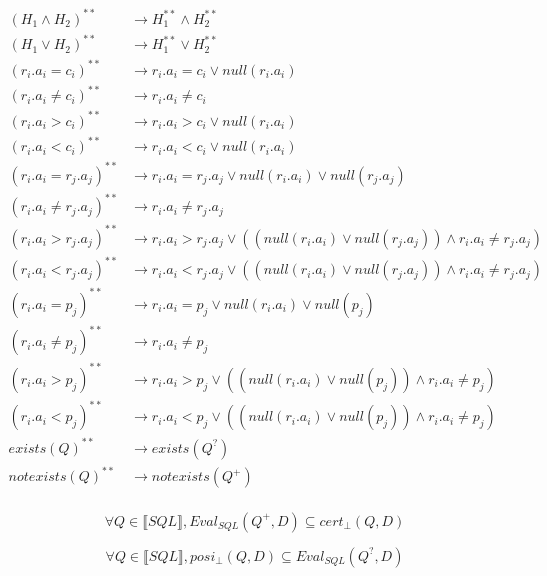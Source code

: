 \begin{align*}
	(H_1 \land H_2)^{**} & \rightarrow H_1^{**} \land H_2^{**} \\
	(H_1 \lor H_2)^{**} & \rightarrow H_1^{**} \lor H_2^{**} \\
	(r_i.a_i = c_i)^{**} & \rightarrow r_i.a_i = c_i \lor null(r_i.a_i)\\
	(r_i.a_i \neq c_i)^{**}& \rightarrow r_i.a_i \neq c_i \\
	(r_i.a_i > c_i)^{**} & \rightarrow r_i.a_i > c_i \lor null(r_i.a_i)\\
	(r_i.a_i < c_i)^{**} & \rightarrow r_i.a_i < c_i \lor null(r_i.a_i)\\
	(r_i.a_i = r_j.a_j)^{**} & \rightarrow r_i.a_i = r_j.a_j \lor null(r_i.a_i) \lor null(r_j.a_j)\\
	(r_i.a_i \neq r_j.a_j)^{**} & \rightarrow r_i.a_i \neq r_j.a_j \\
	(r_i.a_i > r_j.a_j)^{**} & \rightarrow r_i.a_i > r_j.a_j \lor \left( (null(r_i.a_i) \lor null(r_j.a_j)) \land r_i.a_i \neq r_j.a_j \right) \\
	(r_i.a_i < r_j.a_j)^{**} & \rightarrow r_i.a_i < r_j.a_j \lor \left( (null(r_i.a_i) \lor null(r_j.a_j)) \land r_i.a_i \neq r_j.a_j \right) \\
	(r_i.a_i = p_j)^{**} & \rightarrow r_i.a_i = p_j \lor null(r_i.a_i) \lor null(p_j)\\
	(r_i.a_i \neq p_j)^{**} & \rightarrow r_i.a_i \neq p_j \\
	(r_i.a_i > p_j)^{**} & \rightarrow r_i.a_i > p_j \lor \left( (null(r_i.a_i) \lor null(p_j)) \land r_i.a_i \neq p_j \right) \\
	(r_i.a_i < p_j)^{**} & \rightarrow r_i.a_i < p_j \lor \left( (null(r_i.a_i) \lor null(p_j)) \land r_i.a_i \neq p_j \right) \\
	exists(Q)^{**} & \rightarrow exists(Q^?) \\
	notexists(Q)^{**} & \rightarrow notexists(Q^+) \\
\end{align*}

\begin{myprop}
	$$\forall Q \in \llbracket SQL \rrbracket, Eval_{SQL}(Q^+,D) \subseteq cert_\bot(Q,D)$$
\end{myprop}
\begin{myprop}
	$$\forall Q \in \llbracket SQL \rrbracket, posi_\bot(Q,D) \subseteq Eval_{SQL}(Q^?,D)$$
\end{myprop}

